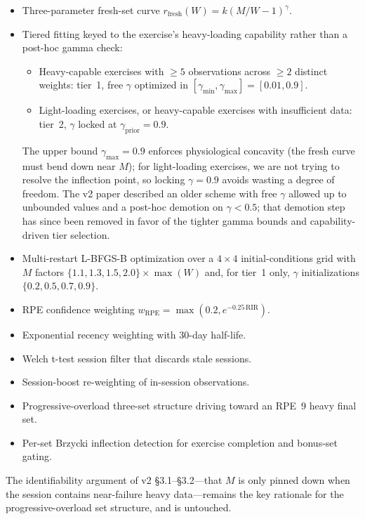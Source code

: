 \documentclass[11pt]{article}
\begin{document}
\begin{itemize}
  \item Three-parameter fresh-set curve $r_\mathrm{fresh}(W)=k(M/W-1)^\gamma$.
  \item Tiered fitting keyed to the exercise's heavy-loading capability rather than a post-hoc gamma check:
    \begin{itemize}
      \item Heavy-capable exercises with $\ge 5$ observations across $\ge 2$ distinct weights: tier~1, free $\gamma$ optimized in $[\gamma_\mathrm{min},\gamma_\mathrm{max}] = [0.01,0.9]$.
      \item Light-loading exercises, or heavy-capable exercises with insufficient data: tier~2, $\gamma$ locked at $\gamma_\mathrm{prior} = 0.9$.
    \end{itemize}
  The upper bound $\gamma_\mathrm{max} = 0.9$ enforces physiological concavity (the fresh curve must bend down near $M$); for light-loading exercises, we are not trying to resolve the inflection point, so locking $\gamma = 0.9$ avoids wasting a degree of freedom.
  The v2 paper described an older scheme with free $\gamma$ allowed up to unbounded values and a post-hoc demotion on $\gamma<0.5$; that demotion step has since been removed in favor of the tighter gamma bounds and capability-driven tier selection.
  \item Multi-restart L-BFGS-B optimization over a $4\times 4$ initial-conditions grid with $M$ factors $\{1.1,1.3,1.5,2.0\}\times\max(W)$ and, for tier~1 only, $\gamma$ initializations $\{0.2,0.5,0.7,0.9\}$.
  \item RPE confidence weighting $w_\mathrm{RPE}=\max(0.2, e^{-0.25\,\mathrm{RIR}})$.
  \item Exponential recency weighting with 30-day half-life.
  \item Welch t-test session filter that discards stale sessions.
  \item Session-boost re-weighting of in-session observations.
  \item Progressive-overload three-set structure driving toward an RPE~9 heavy final set.
  \item Per-set Brzycki inflection detection for exercise completion and bonus-set gating.
\end{itemize}

The identifiability argument of v2 \S 3.1--\S 3.2---that $M$ is only pinned down when the session contains near-failure heavy data---remains the key rationale for the progressive-overload set structure, and is untouched.
\end{document}
